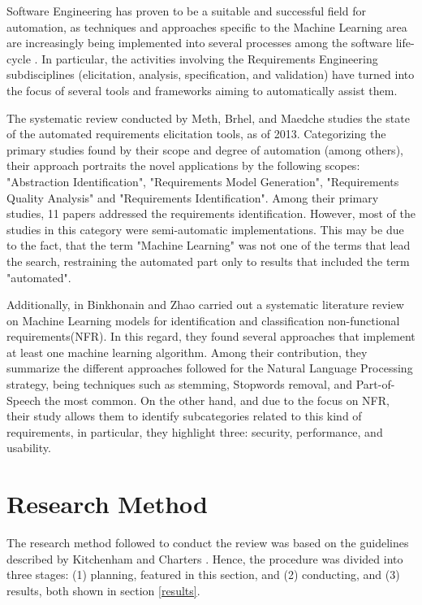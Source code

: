 \documentclass[conference]{IEEEtran}
\begin{document}
Software Engineering has proven to be a suitable and successful field for automation, as techniques and approaches specific to the Machine Learning area are increasingly being implemented into several processes among the software life-cycle \cite{Zhang2003}. In particular, the activities involving the Requirements Engineering subdisciplines (elicitation, analysis, specification, and validation) \cite{Wiegers2013} have turned into the focus of several tools and frameworks aiming to automatically assist them.

The systematic review conducted by Meth, Brhel, and Maedche \cite{Meth2013} studies the state of the automated requirements elicitation tools, as of 2013. Categorizing the primary studies found by their scope and degree of automation (among others), their approach portraits the novel applications by the following scopes: "Abstraction Identification", "Requirements Model Generation", "Requirements Quality Analysis" and "Requirements Identification". Among their primary studies, 11 papers addressed the requirements identification. However, most of the studies in this category were semi-automatic implementations. This may be due to the fact, that the term "Machine Learning" was not one of the terms that lead the search, restraining the automated part only to results that included the term "automated".

Additionally, in \cite{BINKHONAIN2019100001} Binkhonain and Zhao carried out a systematic literature review on Machine Learning models for identification and classification non-functional requirements(NFR). In this regard, they found several approaches that implement at least one machine learning algorithm. Among their contribution, they summarize the different approaches followed for the Natural Language Processing strategy, being techniques such as stemming, Stopwords removal, and Part-of-Speech the most common. On the other hand, and due to the focus on NFR, their study allows them to identify subcategories related to this kind of requirements, in particular, they highlight three: security, performance, and usability.

\section{Research Method}
\label{method}

The research method followed to conduct the review was based on the guidelines described by Kitchenham and Charters \cite{Kitchenham2007}. Hence, the procedure was divided into three stages: (1) planning, featured in this section, and (2) conducting, and (3) results, both shown in section \ref{results}.
\end{document}
